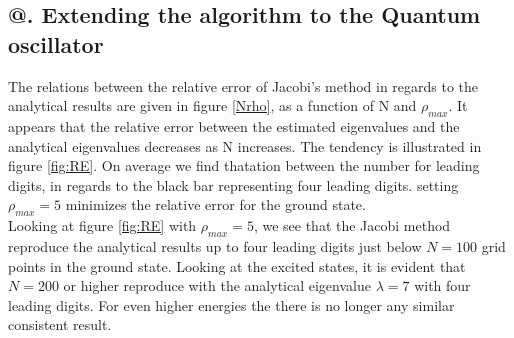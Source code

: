 \documentclass[%
reprint,
amsmath,amssymb,
aps,
]{revtex4-1}
\makeatletter
\newcommand*{\rom}[1]{\expandafter\@slowromancap\romannumeral #1@}
\makeatother
\begin{document}
\subsection*{\rom{2}. Extending the algorithm to the Quantum oscillator} \noindent 
The relations between the relative error of Jacobi's method in regards to the analytical results are given in figure \ref{Nrho}, as a function of N and $\rho_{max}$. It appears that the relative error between the estimated eigenvalues and the analytical eigenvalues decreases as N increases. The tendency is illustrated in figure \ref{fig:RE}. On average we find thatation between the number for leading digits, in regards to the black bar representing four leading digits. setting $\rho_{max} = 5$ minimizes the relative error for the ground state. \\
Looking at figure \ref{fig:RE} with $\rho_{max} = 5$, we see that the Jacobi method reproduce the analytical results up to four leading digits just below $N=100$ grid points in the ground state. Looking at the excited states, it is evident that $N=200$  or higher reproduce with the analytical eigenvalue $\lambda = 7$ with four leading digits. For even higher energies the there is no longer any similar consistent result. \\
\end{document}
